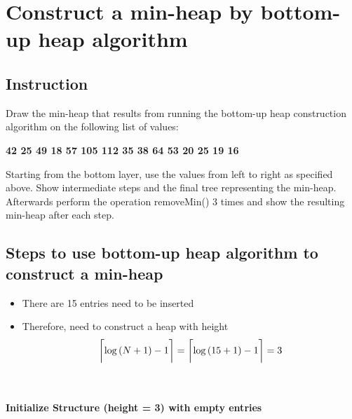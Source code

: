 \section{Construct a min-heap by bottom-up heap algorithm}
\subsection{Instruction}
Draw the min-heap that results from running the bottom-up heap construction algorithm on the
following list of values:
\\
\begin{center}
\textbf{42 25 49 18 57 105 112 35 38 64 53 20 25 19 16}
\end{center}
Starting from the bottom layer, use the values from left to right as specified above. Show
intermediate steps and the final tree representing the min-heap. Afterwards perform the operation
removeMin() 3 times and show the resulting min-heap after each step.

\subsection{Steps to use bottom-up heap algorithm to construct a min-heap}
\begin{itemize}
    \item There are 15 entries need to be inserted
    \item Therefore, need to construct a heap with height 
    \begin{equation}
        \ceil[\bigg]{\log{(N+1)} - 1}
        = \ceil[\bigg]{\log{(15+1)} - 1} = 3
    \end{equation}
\end{itemize}

\\
\\
\textbf{Initialize Structure (height = 3) with empty entries}
\\
\\

